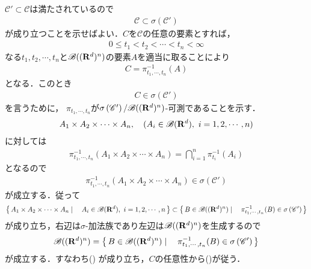 	\begin{sketch}
		$\mathscr{C}' \subset \mathscr{C}$は満たされているので
		\begin{align}
			\mathscr{C} \subset \sigma\left(\mathscr{C}' \right)
			\label{eq:chapter_2_one_dimensional_cylinder_set_1}
		\end{align}
		が成り立つことを示せばよい．$C$を$\mathscr{C}$の任意の要素とすれば，
		\begin{align}
		0 \leq t_1 < t_2 < \cdots < t_n < \infty
		\end{align}
		なる$t_1,t_2,\cdots,t_n$と$\mathscr{B}((\mathbf{R}^d)^n)$の要素$A$を適当に取ることにより
		\begin{align}
			C = \pi_{t_1,\cdots,t_n}^{-1}(A)
		\end{align}
		となる．このとき
		\begin{align}
			C \in \sigma\left(\mathscr{C}' \right)
			\label{eq:chapter_2_one_dimensional_cylinder_set_2}
		\end{align}
		を言うために，
		$\pi_{t_1,\cdots,t_n}$が$\sigma\left(\mathscr{C}' \right)/\mathscr{B}((\mathbf{R}^d)^n)$-可測であることを示す．
		\begin{align}
			A_1 \times A_2 \times \cdots \times A_n,\quad (A_i \in \mathscr{B}(\mathbf{R}^d),\ i=1,2,\cdots,n)
		\end{align}
		に対しては
		\begin{align}
			\pi_{t_1,\cdots,t_n}^{-1}(A_1 \times A_2 \times \cdots \times A_n)
			= \bigcap_{i=1}^n \pi_{t_i}^{-1}(A_i)
		\end{align}
		となるので
		\begin{align}
			\pi_{t_1,\cdots,t_n}^{-1}(A_1 \times A_2 \times \cdots \times A_n)
			\in \sigma\left(\mathscr{C}' \right)
		\end{align}
		が成立する．従って
		\begin{align}
			\left\{\, A_1 \times A_2 \times \cdots \times A_n \mid \quad A_i \in \mathscr{B}(\mathbf{R}^d),\ i=1,2,\cdots,n\, \right\}
			\subset \left\{\, B \in \mathscr{B}((\mathbf{R}^d)^n) \mid \quad \pi_{t_1,\cdots,t_n}^{-1}(B)
			\in \sigma\left(\mathscr{C}' \right)\, \right\}
		\end{align}
		が成り立ち，右辺は$\sigma$-加法族であり左辺は$\mathscr{B}((\mathbf{R}^d)^n)$を生成するので
		\begin{align}
			\mathscr{B}((\mathbf{R}^d)^n) = 
			\left\{\, B \in \mathscr{B}((\mathbf{R}^d)^n) \mid \quad \pi_{t_1,\cdots,t_n}^{-1}(B)
			\in \sigma\left(\mathscr{C}' \right)\, \right\}
		\end{align}
		が成立する．すなわち()
		が成り立ち，$C$の任意性から()が従う．
		\QED
	\end{sketch}
	

